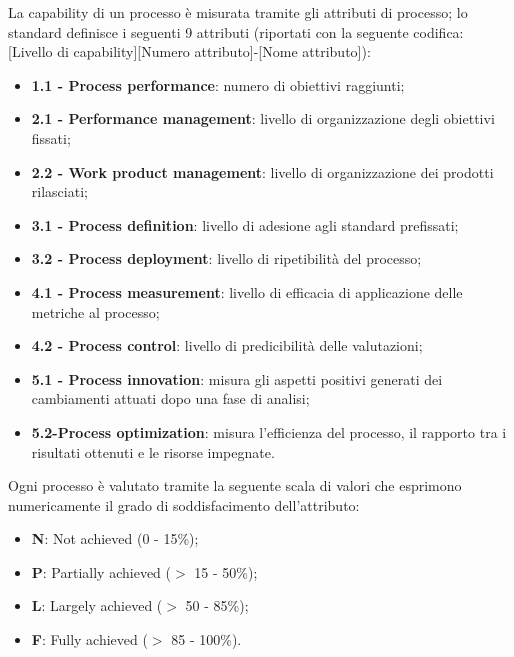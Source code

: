 La capability di un processo è misurata tramite gli attributi di processo; lo standard definisce i seguenti 9 attributi
(riportati con la seguente codifica: [Livello di capability][Numero attributo]-[Nome attributo]):
\begin{itemize}
	\item \textbf{1.1 - Process performance}: numero di obiettivi raggiunti;
	\item \textbf{2.1 - Performance management}: livello di organizzazione degli obiettivi fissati;
	\item \textbf{2.2 - Work product management}: livello di organizzazione dei prodotti rilasciati;
	\item \textbf{3.1 - Process definition}: livello di adesione agli standard prefissati;
	\item \textbf{3.2 - Process deployment}: livello di ripetibilità del processo;
	\item \textbf{4.1 - Process measurement}: livello di efficacia di applicazione delle metriche al processo;
	\item \textbf{4.2 - Process control}: livello di predicibilità delle valutazioni;
	\item \textbf{5.1 - Process innovation}: misura gli aspetti positivi generati dei cambiamenti attuati dopo una
	fase di analisi;
	\item \textbf{5.2-Process optimization}: misura l'efficienza del processo, il rapporto tra i risultati ottenuti e
	le risorse impegnate.
\end{itemize}

Ogni processo è valutato tramite la seguente scala di valori che esprimono numericamente il grado di
soddisfacimento dell'attributo:
\begin{itemize}
	\item \textbf{N}: Not achieved (0 - 15\%);
	\item \textbf{P}: Partially achieved ($>$ 15 - 50\%);
	\item \textbf{L}: Largely achieved ($>$ 50 - 85\%);
	\item \textbf{F}: Fully achieved ($>$ 85 - 100\%).
\end{itemize}
